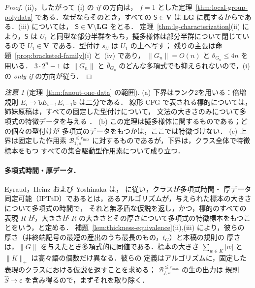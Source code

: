 \documentclass[11pt,a4paper]{ltjsarticle}
\numberwithin{equation}{section}
\theoremstyle{plain}
\theoremstyle{definition}
\theoremstyle{remark}
\newtheorem{remark}[theorem]{注意}
\newcommand{\eps}{\varepsilon}
\theoremstyle{plain}
\begin{document}
\begin{proof}
(ii)，したがって (i) の \emph{if} の方向は，
$f=1$ とした定理~\ref{thm:local-group-polydata} である．なぜならそのとき，すべての
$\mathsf S\in\mathbf V$ は $\mathbf{LG}$ に属するからである．(iii) については，
$\mathsf S\in\mathbf V\setminus\mathbf{LG}$ をとる．
定理~\ref{thm:lg-characterization}(ii) により，$\mathsf S$ は
$U_1$ と同型な部分半群をもち，擬多様体は部分半群について閉じているので
$U_1\in\mathbf V$ である．型付け $s_U$ は $U_1$ の上へ写す；
残りの主張は命題~\ref{prop:bracketed-family}(i) と~(iv) であり，
$\|G_n\|=O(n)$ と $\theta_{G_n}\le4n$ を用いる．
$3\cdot2^n-1$ は $\|G_n\|$ と
$\bar\theta_{G_n}$ のどんな多項式でも抑えられないので，(i) の \emph{only if} の方向が従う．
\end{proof}

\begin{remark}[定理~\ref{thm:fanout-one-data} の範囲]
\label{rem:fanout-one-data}
(a) 下界はランク2を用いる：倍増規則
$E_i\to\mathtt bE_{i-1}E_{i-1}\mathtt b$ は二分である．
線形 CFG で表される標的については，姉妹原稿は，すべての固定した型付けについて，
文法の大きさのみについて多項式の特徴データを与える
\cite[Theorem~8.3]{kuriyamaCFG}．
(b) この定理は擬多様体に関するものである；どの個々の型付けが
多項式のデータをもつかは，ここでは特徴づけない．
(c) 上界は固定した作用素
$\mathcal B^{\le r_{\max}}_{1,s}$ に対するものであるが，下界は，クラス全体で特徴標本をもつ
すべての集合駆動型作用素について成り立つ．
\end{remark}

\paragraph{多項式時間・厚データ．}
Eyraud，Heinz および Yoshinaka \cite[Definition~2.12]{EyraudHeinzYoshinaka2016} は，
\cite{Yoshinaka2008} に従い，クラスが多項式時間・
厚データ同定可能（IPTtD）であるとは，あるアルゴリズムが，与えられた標本の大きさについて多項式の時間で，
それと無矛盾な仮説を返し，かつ，標的のすべての表現 $R$
が，大きさが $R$ の大きさとその厚さについて多項式の特徴標本をもつことをいう，と定める．
補題~\ref{lem:thickness-equivalence}(ii),(iii) により，彼らの
厚さ（非終端記号の最短の産出のうち最長のもの，$t_G$）と本稿の規則の
厚さは，$\|G\|$ を与えたとき多項式的に同値である．標本の大きさ
$\sum_{w\in K}|w|$ と $\|K\|_+$ は高々語の個数だけ異なる．彼らの
定義はアルゴリズムに，固定した表現のクラスにおける仮説を返すことを求める；
$\mathcal B^{\le r_{\max}}_{f,s}$ の生の出力は
規則 $\widehat S\to\eps$ を含み得るので，まずそれを取り除く．
\end{document}
